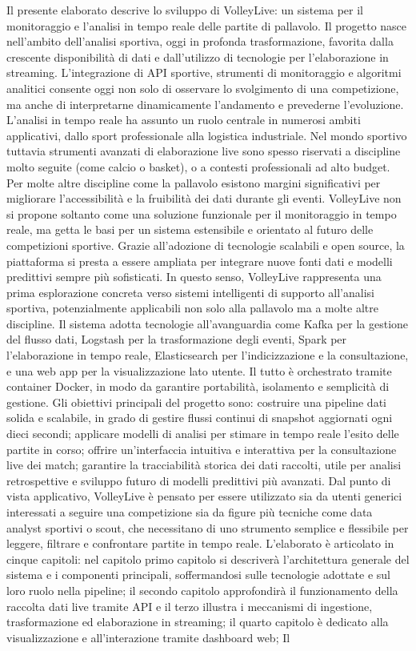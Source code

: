 \documentclass[a4paper,12pt]{report}
\begin{document}
Il presente elaborato descrive lo sviluppo di VolleyLive: un sistema per il monitoraggio e l’analisi in tempo reale delle partite di pallavolo. Il progetto nasce nell’ambito dell’analisi sportiva, oggi in profonda trasformazione, favorita dalla crescente disponibilità di dati e dall’utilizzo di tecnologie per l’elaborazione in streaming. L’integrazione di API sportive, strumenti di monitoraggio e algoritmi analitici consente oggi non solo di osservare lo svolgimento di una competizione, ma anche di interpretarne dinamicamente l’andamento e prevederne l’evoluzione. L’analisi in tempo reale ha assunto un ruolo centrale in numerosi ambiti applicativi, dallo sport professionale alla logistica industriale. Nel mondo sportivo tuttavia strumenti avanzati di elaborazione live sono spesso riservati a discipline molto seguite (come calcio o basket), o a contesti professionali ad alto budget. Per molte altre discipline come la pallavolo esistono margini significativi per migliorare l’accessibilità e la fruibilità dei dati durante gli eventi. VolleyLive non si propone soltanto come una soluzione funzionale per il monitoraggio in tempo reale, ma getta le basi per un sistema estensibile e orientato al futuro delle competizioni sportive. Grazie all’adozione di tecnologie scalabili e open source, la piattaforma si presta a essere ampliata per integrare nuove fonti dati e modelli predittivi sempre più sofisticati. In questo senso, VolleyLive rappresenta una prima esplorazione concreta verso sistemi intelligenti di supporto all’analisi sportiva, potenzialmente applicabili non solo alla pallavolo ma a molte altre discipline. Il sistema adotta tecnologie all'avanguardia come Kafka per la gestione del flusso dati, Logstash per la trasformazione degli eventi, Spark per l’elaborazione in tempo reale, Elasticsearch per l’indicizzazione e la consultazione, e una web app per la visualizzazione lato utente. Il tutto è orchestrato tramite container Docker, in modo da garantire portabilità, isolamento e semplicità di gestione. Gli obiettivi principali del progetto sono: costruire una pipeline dati solida e scalabile, in grado di gestire flussi continui di snapshot aggiornati ogni dieci secondi; applicare modelli di analisi per stimare in tempo reale l’esito delle partite in corso; offrire un’interfaccia intuitiva e interattiva per la consultazione live dei match; garantire la tracciabilità storica dei dati raccolti, utile per analisi retrospettive e sviluppo futuro di modelli predittivi più avanzati. Dal punto di vista applicativo, VolleyLive è pensato per essere utilizzato sia da utenti generici interessati a seguire una competizione sia da figure più tecniche come data analyst sportivi o scout, che necessitano di uno strumento semplice e flessibile per leggere, filtrare e confrontare partite in tempo reale. L'elaborato è articolato in cinque capitoli: nel capitolo primo capitolo si descriverà l’architettura generale del sistema e i componenti principali, soffermandosi sulle tecnologie adottate e sul loro ruolo nella pipeline; il secondo capitolo approfondirà il funzionamento della raccolta dati live tramite API e il terzo illustra i meccanismi di ingestione, trasformazione ed elaborazione in streaming; il quarto capitolo è dedicato alla visualizzazione e all’interazione tramite dashboard web; Il 
\end{document}
